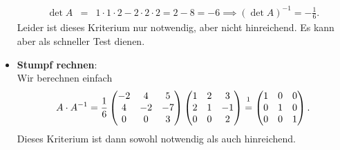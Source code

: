 \begin{Beispiel}
\begin{itemize}
\begin{eqnarray*}
        \det A&=&1\cdot 1\cdot 2-2\cdot 2\cdot 2=2-8=-6\implies (\det A)^{-1}=-\frac{1}{6}.
    \end{eqnarray*}
    Leider ist dieses Kriterium nur notwendig, aber nicht hinreichend. Es kann aber als schneller Test dienen.
    \item \textbf{Stumpf rechnen}:\\
    Wir berechnen einfach
    \begin{equation*}
        A\cdot A^{-1}=\frac{1}{6}\Matrix{-2&4&5\\4&-2&-7\\0&0&3}\Matrix{1&2&3\\2&1&-1\\0&0&2}\overset{\footnote{Wir tun an dieser Stelle einfach mal so, als hätten wir das wirklich gerechnet ;)}}{=}\Matrix{1&0&0\\0&1&0\\0&0&1}.
    \end{equation*}
    Dieses Kriterium ist dann sowohl notwendig als auch hinreichend.
\end{itemize}
\end{Beispiel}

